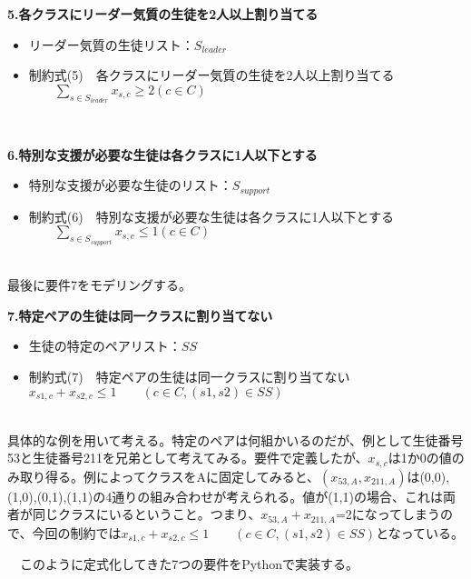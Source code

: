 \documentclass{jsarticle}
\begin{document}
\begin{itembox}[l]{{\bf 5.各クラスにリーダー気質の生徒を2人以上割り当てる}}
	\begin{itemize}
		\item リーダー気質の生徒リスト：$S_{leader}$ 
		\item 制約式(5)　各クラスにリーダー気質の生徒を2人以上割り当てる \\
		${\qquad \displaystyle \sum_{s \in S_{leader}}x_{s,c} \geq 2}　(c \in C)$
	\end{itemize}
\end{itembox} \\
\begin{itembox}[l]{{\bf 6.特別な支援が必要な生徒は各クラスに1人以下とする}}
	\begin{itemize}
		\item 特別な支援が必要な生徒のリスト：$S_{support}$ 
		\item 制約式(6)　特別な支援が必要な生徒は各クラスに1人以下とする \\
		${\qquad \displaystyle \sum_{s \in S_{support}}x_{s,c} \le 1}　(c \in C)$
	\end{itemize}
\end{itembox}\\

最後に要件7をモデリングする。
\begin{itembox}[l]{{\bf 7.特定ペアの生徒は同一クラスに割り当てない}}
	\begin{itemize}
		\item 生徒の特定のペアリスト：$SS$ 
		\item 制約式(7)　特定ペアの生徒は同一クラスに割り当てない \\
		$x_{s1,c}+x_{s2,c} \le 1 \qquad(c \in C, (s1,s2) \in SS)$
	\end{itemize}
\end{itembox} \\

具体的な例を用いて考える。特定のペアは何組かいるのだが、例として生徒番号53と生徒番号211を兄弟として考えてみる。要件で定義したが、$x_{s,c}$は1か0の値のみ取り得る。例によってクラスをAに固定してみると、$(x_{53,A},x_{211,A})$は(0,0),(1,0),(0,1),(1,1)の4通りの組み合わせが考えられる。値が(1,1)の場合、これは両者が同じクラスにいるということ。つまり、$x_{53,A}+x_{211,A}$=2になってしまうので、今回の制約では$x_{s1,c}+x_{s2,c} \le 1 \qquad(c \in C, (s1,s2) \in SS)$となっている。
\par　このように定式化してきた7つの要件をPythonで実装する。
\end{document}
